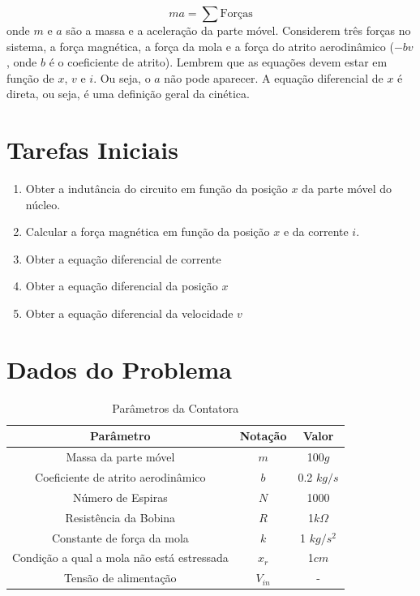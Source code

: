 \documentclass[a4paper]{article}
\theoremstyle{definition}
\theoremstyle{plain}
\begin{document}
\begin{equation}
m a = \displaystyle \sum \text{Forças}
\end{equation}
%
onde $m$ e $a$ são a massa e a aceleração da parte móvel. Considerem três forças no sistema, a força magnética, a força da mola e a força do atrito aerodinâmico ($-b v$, onde $b$ é o coeficiente de atrito). Lembrem que as equações devem estar em função de $x$, $v$ e $i$. Ou seja, o $a$ não pode aparecer. A equação diferencial de $x$ é direta, ou seja, é uma definição geral da cinética. 



\section{Tarefas Iniciais}


\begin{enumerate}
	\item Obter a indutância do circuito em função da posição $x$ da parte móvel do núcleo.
	\item Calcular a força magnética em função da posição $x$ e da corrente $i$.
	\item Obter a equação diferencial de corrente
	\item Obter a equação diferencial da posição $x$
	\item Obter a equação diferencial da velocidade $v$
\end{enumerate}





\section{Dados do Problema}





\begin{table}[H]
\centering
\caption{Parâmetros da Contatora}
\begin{tabular}{ccc}
\hline
\textbf{Parâmetro} & \textbf{Notação} & \textbf{Valor}\\ \hline
Massa da parte móvel & $m$ & 100$g$\\
Coeficiente de atrito aerodinâmico & $b$ & 0.2 $kg/s$\\
Número de Espiras & $N$ & 1000\\
Resistência da Bobina & $R$ & 1$k\Omega$\\
Constante de força da mola & $k$ & 1 $kg/s^2$\\ 
Condição a qual a mola não está estressada & $x_r$ & 1$cm$\\ 
Tensão de alimentação & $V_{in}$ & -\\ 
\hline
\end{tabular}
\end{table}
\end{document}
